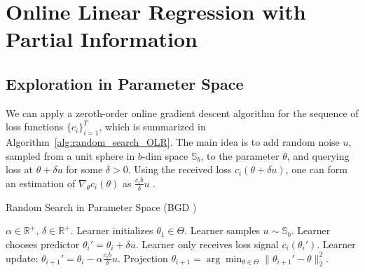 \section{Online Linear Regression with Partial Information}
\label{sec:olr}
%
 

\subsection{Exploration in Parameter Space}
We can apply a zeroth-order
online gradient descent algorithm for the sequence of loss functions
$\{c_i\}_{i=1}^T$, which is summarized in
Algorithm~\ref{alg:random_search_OLR}. The main idea is to add random
noise $u$, sampled from a unit sphere in $b$-dim space $\mathbb{S}_{b}$, to the parameter $\theta$, and querying loss at $\theta+\delta u$ for some $\delta > 0$. Using the received loss $c_i(\theta+\delta u)$, one can form an estimation of $\nabla_{\theta}c_i(\theta)$ as $\frac{c_i b}{\delta}u$ \citep{flaxman2005online}. 

%

\begin{algorithm}[ht]
\caption{Random Search in Parameter Space (BGD \cite{flaxman2005online})}
 \label{alg:random_search_OLR}
\begin{algorithmic}[1]
   $\alpha\in\mathbb{R}^+$, $\delta\in\mathbb{R}^+$.
  \State Learner initializes $\theta_1\in\Theta$.
    \State Learner samples $u\sim \mathbb{S}_{b}$. 
    \State Learner chooses predictor $\theta_i' = \theta_i + \delta u$. 
    \State Learner only receives loss signal $c_i(\theta_i')$. %
    \State Learner update: $\theta_{i+1}' = \theta_i - \alpha \frac{c_i b}{\delta}u$.
    \State Projection $\theta_{i+1} = \arg\min_{\theta\in{\Theta}}\|\theta_{i+1}'-\theta\|_2^2$.
  \EndFor
\end{algorithmic}
\end{algorithm}


